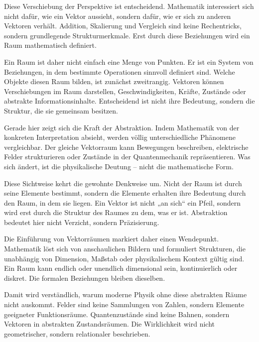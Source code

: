 Diese Verschiebung der Perspektive ist entscheidend. Mathematik interessiert sich nicht dafür, wie ein Vektor aussieht, sondern dafür, wie er sich zu anderen Vektoren verhält. Addition, Skalierung und Vergleich sind keine Rechentricks, sondern grundlegende Strukturmerkmale. Erst durch diese Beziehungen wird ein Raum mathematisch definiert.

Ein Raum ist daher nicht einfach eine Menge von Punkten. Er ist ein System von Beziehungen, in dem bestimmte Operationen sinnvoll definiert sind. Welche Objekte diesen Raum bilden, ist zunächst zweitrangig. Vektoren können Verschiebungen im Raum darstellen, Geschwindigkeiten, Kräfte, Zustände oder abstrakte Informationsinhalte. Entscheidend ist nicht ihre Bedeutung, sondern die Struktur, die sie gemeinsam besitzen.

Gerade hier zeigt sich die Kraft der Abstraktion. Indem Mathematik von der konkreten Interpretation absieht, werden völlig unterschiedliche Phänomene vergleichbar. Der gleiche Vektorraum kann Bewegungen beschreiben, elektrische Felder strukturieren oder Zustände in der Quantenmechanik repräsentieren. Was sich ändert, ist die physikalische Deutung – nicht die mathematische Form.

Diese Sichtweise kehrt die gewohnte Denkweise um. Nicht der Raum ist durch seine Elemente bestimmt, sondern die Elemente erhalten ihre Bedeutung durch den Raum, in dem sie liegen. Ein Vektor ist nicht „an sich“ ein Pfeil, sondern wird erst durch die Struktur des Raumes zu dem, was er ist. Abstraktion bedeutet hier nicht Verzicht, sondern Präzisierung.

Die Einführung von Vektorräumen markiert daher einen Wendepunkt. Mathematik löst sich von anschaulichen Bildern und formuliert Strukturen, die unabhängig von Dimension, Maßstab oder physikalischem Kontext gültig sind. Ein Raum kann endlich oder unendlich dimensional sein, kontinuierlich oder diskret. Die formalen Beziehungen bleiben dieselben.

Damit wird verständlich, warum moderne Physik ohne diese abstrakten Räume nicht auskommt. Felder sind keine Sammlungen von Zahlen, sondern Elemente geeigneter Funktionsräume. Quantenzustände sind keine Bahnen, sondern Vektoren in abstrakten Zustandsräumen. Die Wirklichkeit wird nicht geometrischer, sondern relationaler beschrieben.

